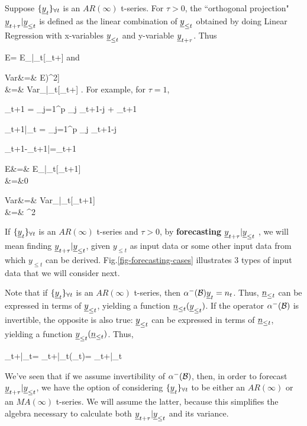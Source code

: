 Suppose
${\{{\underline{y}}_t\}_{\forall t}}$
is an $AR(\infty)$ t-series. For $\tau>0$,
the ``orthogonal projection"
${\underline{y}}_{t+\tau}|{\underline{y}}_{\leq t}$
is defined as the
linear combination of ${\underline{y}}_{\leq t}$
obtained by doing
Linear Regression
with x-variables
${\underline{y}}_{\leq t}$
and y-variable
${\underline{y}}_{t+\tau}$. Thus

\beq
E
=
E_{|\rvy_{\leq t}}[\rvy_{t+\tau}]
\eeq
and

\beqa
Var&=&
E\left[
\left(\rvy_{t+\tau}|\rvy_{\leq t}
-E[\rvy_{t+\tau}|\rvy_{\leq t}]
\right)^2\right]
\\
&=&
Var_{|\rvy_{\leq t}}[\rvy_{t+\tau}]
\;.
\eeqa
For example, for $\tau=1$,


\beq
\rvy_{t+1} = \sum_{j=1}^p \alp_j \rvy_{t+1-j}
+ \rvn_{t+1}
\eeq

\beq
\rvy_{t+1}|\rvy_{\leq t} =
\sum_{j=1}^p \alp_j \rvy_{t+1-j}
\eeq

\beq
\rvy_{t+1}-\rvy_{t+1|}=\rvn_{t+1}
\eeq

\beqa
E&=&
E_{|\rvy_{\leq t}}[\rvy_{t+1}]
\\
&=&0
\eeqa

\beqa
Var
&=&
Var_{|\rvy_{\leq t}}[\rvy_{t+1}]
\\
&=& \s^2
\eeqa

If ${\{{\underline{y}}_t\}_{\forall t}}$
is an $AR(\infty)$
t-series and $\tau>0$,
by {\bf forecasting} ${\underline{y}}_{t+\tau}|{\underline{y}}_{\leq t}$ ,
we will mean
finding ${\underline{y}}_{t+\tau}|{\underline{y}}_{\leq t}$,
given
$y_{\leq t}$
as input data
or some other input data
from which $y_{\leq t}$
can be derived.
Fig.\ref{fig-forecasting-cases}
illustrates 3 types
of input
data that we will consider
next.



Note that if ${\{{\underline{y}}_t\}_{\forall t}}$
is an $AR(\infty)$
t-series,
then $\alpha^-({\cal B}){\underline{y}}_t=n_t$.
Thus, ${\underline{n}}_{\leq t}$
can be expressed in terms
of ${\underline{y}}_{\leq t}$,
yielding a function
${\underline{n}}_{\leq t}({\underline{y}}_{\leq t})$.
If the operator
$\alpha^-({\cal B})$
is invertible,
the opposite is also true: ${\underline{y}}_{\leq t}$
can be expressed in terms
of ${\underline{n}}_{\leq t}$,
yielding a function
${\underline{y}}_{\leq t}({\underline{n}}_{\leq t})$.
Thus,

\beq
\rvy_{t+\tau}|\rvy_{\leq t}=
\rvy_{t+\tau}|\rvy_{\leq t}(\rvn_{\leq t})=
\rvy_{t+\tau}|\rvn_{\leq t}
\eeq

We've
seen that
 if we
assume invertibility
of $\alpha^-({\cal B})$, then,
in order
to forecast ${\underline{y}}_{t+\tau}|{\underline{y}}_{\leq t}$,
we have the option
of considering ${\{{\underline{y}}_t\}_{\forall t}}$ to be
either an $AR(\infty)$
or an $MA(\infty)$
t-series. We will assume
the latter,
because this
simplifies
the algebra
necessary to calculate
both
${\underline{y}}_{t+\tau}|{\underline{y}}_{\leq t}$
and its
variance.


